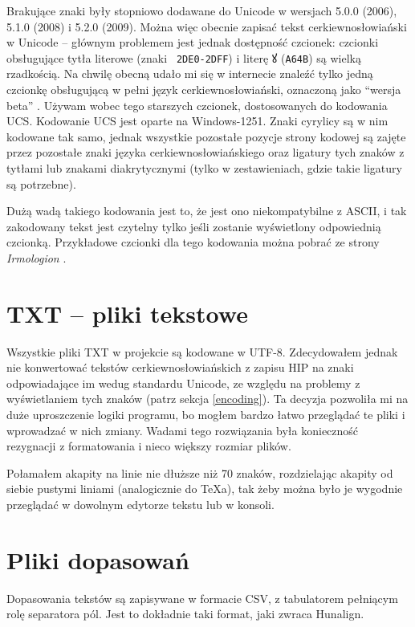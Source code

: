 \documentclass{pracamgr}
\begin{document}
Brakujące znaki były stopniowo dodawane do Unicode w wersjach 5.0.0
(2006), 5.1.0 (2008) i 5.2.0 (2009). Można więc obecnie zapisać tekst
cerkiewno\-{}słowiański w Unicode -- głównym problemem jest jednak
dostępność czcionek: czcionki obsługujące tytła literowe (znaki {\tt
  2DE0-2DFF}) i literę {\cyr ꙋ} ({\tt A64B}) są wielką rzadkością. Na
chwilę obecną udało mi się w internecie znaleźć tylko jedną czcionkę
obsługującą w pełni język cerkiewno\-{}słowiański, oznaczoną jako
``wersja beta'' \cite{ponomar}. Używam wobec tego starszych czcionek,
dostosowanych do kodowania UCS. Kodowanie UCS jest oparte na
Windows-1251. Znaki cyrylicy są w nim kodowane tak samo, jednak
wszystkie pozostałe pozycje strony kodowej są zajęte przez pozostałe
znaki języka cerkiewno\-{}słowiańskiego oraz ligatury tych znaków z
tytłami lub znakami diakrytycznymi (tylko w zestawieniach, gdzie takie
ligatury są potrzebne).

Dużą wadą takiego kodowania jest to, że jest ono niekompatybilne z
ASCII, i tak zakodowany tekst jest czytelny tylko jeśli zostanie
wyświetlony odpowiednią czcionką. Przykładowe czcionki dla tego
kodowania można pobrać ze strony \textit{Irmologion}
\cite{irmologion}.

\section{TXT -- pliki tekstowe}

Wszystkie pliki TXT w projekcie są kodowane w UTF-8. Zdecydowałem
jednak nie konwertować tekstów cerkiewno\-{}słowiańskich z zapisu HIP na
znaki odpowiadające im wedug standardu Unicode, ze względu na problemy
z wyświetlaniem tych znaków (patrz sekcja \ref{encoding}). Ta decyzja
pozwoliła mi na duże uproszczenie logiki programu, bo mogłem bardzo
łatwo przeglądać te pliki i wprowadzać w nich zmiany. Wadami tego
rozwiązania była konieczność rezygnacji z formatowania i nieco większy
rozmiar plików.

Połamałem akapity na linie nie dłuższe niż 70 znaków, rozdzielając
akapity od siebie pustymi liniami (analogicznie do TeXa), tak żeby można
było je wygodnie przeglądać w dowolnym edytorze tekstu lub w konsoli.

\section{Pliki dopasowań}

Dopasowania tekstów są zapisywane w formacie CSV, z tabulatorem
pełniącym rolę separatora pól. Jest to dokładnie taki format, jaki
zwraca Hunalign.
\end{document}
